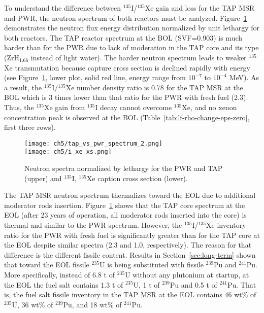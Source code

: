 To understand the difference between $^{135}$I/$^{135}$Xe gain and loss for 
the \gls{TAP} \gls{MSR} and \gls{PWR}, the neutron spectrum of both reactors 
must be analyzed. Figure~\ref{fig:tap-pwr-spectrum} 
demonstrates the neutron flux energy distribution normalized by unit lethargy 
for both reactors. The \gls{TAP} reactor spectrum at the \gls{BOL} (SVF=0.903) 
is much harder than for the \gls{PWR} due to lack of moderation in the 
\gls{TAP} core and its type (ZrH$_{1.66}$ instead of light water). The harder 
neutron spectrum leads to weaker $^{135}$Xe transmutation because capture 
cross section is declined rapidly with energy (see 
Figure~\ref{fig:tap-pwr-spectrum}, lower plot, solid red line, energy range 
from $10^{-7}$ to $10^{-4}$ MeV). As a result, the $^{135}$I/$^{135}$Xe number 
density ratio is 0.78 for the \gls{TAP} \gls{MSR} at the \gls{BOL} 
which is 3 times lower than that ratio for the \gls{PWR} with fresh fuel 
(2.3). Thus, the $^{135}$Xe gain from $^{135}$I decay cannot overcome 
$^{135}$Xe, and no xenon concentration peak is observed at the \gls{BOL} 
(Table~\ref{tab:lf-rho-change-eps-zero}, first three rows).
\begin{figure}[hbp!] %
	\centering
	\texttt{[image: ch5/tap\_vs\_pwr\_spectrum\_2.png]}\\
	\vspace{-19mm}
	\hspace{+0.05mm}
	\texttt{[image: ch5/i\_xe\_xs.png]}
	\vspace{-8mm}
	\caption{Neutron spectra normalized by lethargy for the \gls{PWR} and 
		\gls{TAP} (upper) and $^{135}$I, $^{135}$Xe caption cross 
		section (lower).}
	\label{fig:tap-pwr-spectrum}
\end{figure}


The \gls{TAP} \gls{MSR} neutron spectrum thermalizes toward the \gls{EOL} due 
to additional moderator rods insertion. Figure~\ref{fig:tap-pwr-spectrum} 
shows that the \gls{TAP} core spectrum at the \gls{EOL} (after 23 years of 
operation, all moderator rods inserted into the core) is thermal and  similar 
to the \gls{PWR} spectrum. However, the $^{135}$I/$^{135}$Xe inventory ratio 
for the \gls{PWR} with fresh fuel is significantly greater than for the 
\gls{TAP} core at the \gls{EOL} despite similar spectra (2.3 and 1.0, 
respectively). The reason for that difference is the different fissile 
content. Results in Section~\ref{sec:long-term} shown that toward the 
\gls{EOL} fissile 
$^{235}$U is being substituted with fissile $^{239}$Pu and $^{241}$Pu. More 
specifically, instead of 6.8 t of $^{235}$U without any plutonium at startup, 
at the \gls{EOL} the fuel salt contains 1.3 t of $^{235}$U, 1 t of 
$^{239}$Pu and 0.5 t of $^{241}$Pu. That is, the fuel salt fissile inventory 
in the \gls{TAP} \gls{MSR} at the \gls{EOL} contains 46 wt\% of $^{235}$U, 36 
wt\% of $^{239}$Pu, and 18 wt\% of $^{241}$Pu.

